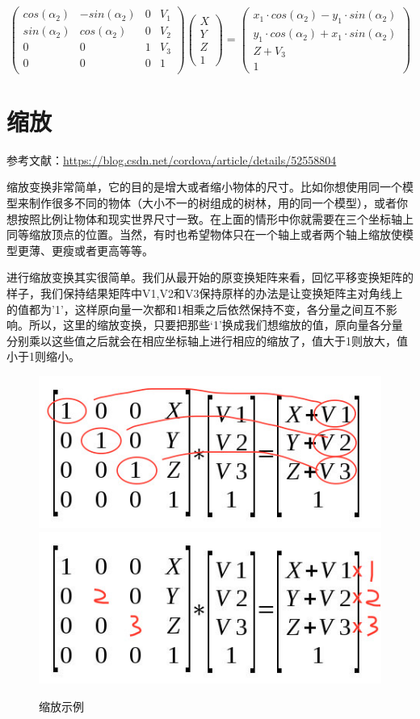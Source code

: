 \documentclass[UTF8,a4paper,12pt]{ctexbook}
\begin{document}
		\begin{equation}
		\left(
		\begin{array}{cccc}
		cos(\alpha_2) & -sin(\alpha_2) & 0& V_1\\
		
		sin(\alpha_2) & cos(\alpha_2) & 0& V_2\\
		
		0 & 0 & 1& V_3\\
		
		0 & 0 & 0& 1\\
		\end{array}
		\right)
		\left(
		\begin{array}{c}
		X\\ 
		Y\\
		Z\\
		1 
		\end{array}	
		\right) 
		=
		\left(
		\begin{array}{c}
		x_1\cdot cos(\alpha_2) - y_1\cdot sin(\alpha_2)\\ 
		y_1\cdot cos(\alpha_2) + x_1\cdot sin(\alpha_2)\\
		Z+V_3\\
		1 
		\end{array}	
		\right)
		\end{equation}
	\section{缩放}
		参考文献：\url{https://blog.csdn.net/cordova/article/details/52558804}

		缩放变换非常简单，它的目的是增大或者缩小物体的尺寸。比如你想使用同一个模型来制作很多不同的物体（大小不一的树组成的树林，用的同一个模型），或者你想按照比例让物体和现实世界尺寸一致。在上面的情形中你就需要在三个坐标轴上同等缩放顶点的位置。当然，有时也希望物体只在一个轴上或者两个轴上缩放使模型更薄、更瘦或者更高等等。
		
		进行缩放变换其实很简单。我们从最开始的原变换矩阵来看，回忆平移变换矩阵的样子，我们保持结果矩阵中V1,V2和V3保持原样的办法是让变换矩阵主对角线上的值都为’1’，这样原向量一次都和1相乘之后依然保持不变，各分量之间互不影响。所以，这里的缩放变换，只要把那些‘1’换成我们想缩放的值，原向量各分量分别乘以这些值之后就会在相应坐标轴上进行相应的缩放了，值大于1则放大，值小于1则缩小。
		
		\begin{figure}[H]
			\centering
			\includegraphics[width=.46\linewidth]{scale_1.png}
			\includegraphics[width=.46\linewidth]{scale_2.png}
			\caption{缩放示例}
		\end{figure}
		
\end{document}

